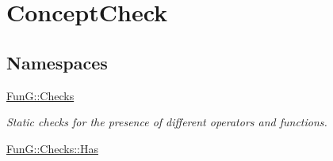 \hypertarget{group__ConceptCheck}{\section{Concept\-Check}
\label{group__ConceptCheck}
}
\subsection*{Namespaces}
\begin{DoxyCompactItemize}
\item 
\hyperlink{namespaceFunG_1_1Checks}{Fun\-G\-::\-Checks}
\begin{DoxyCompactList}\small\item\em Static checks for the presence of different operators and functions. \end{DoxyCompactList}\item 
\hyperlink{namespaceFunG_1_1Checks_1_1Has}{Fun\-G\-::\-Checks\-::\-Has}
\end{DoxyCompactItemize}
